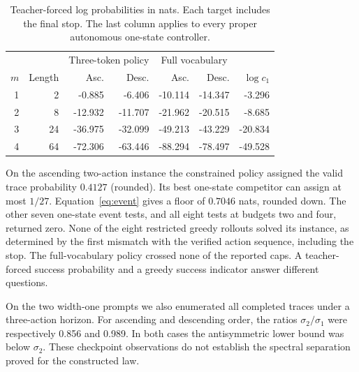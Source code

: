 \begin{table}[ht]
\centering\small
\caption{Teacher-forced log probabilities in nats. Each target includes the final stop. The last column applies to every proper autonomous one-state controller.}\label{tab:qwen}
\begin{tabular}{rr rr rr r}\toprule
&& \multicolumn{2}{c}{Three-token policy}&\multicolumn{2}{c}{Full vocabulary}&\\
$m$ & Length & Asc. & Desc. & Asc. & Desc. & $\log c_1$\\\midrule
1 & 2 & -0.885 & -6.406 & -10.114 & -14.347 & -3.296 \\
2 & 8 & -12.932 & -11.707 & -21.962 & -20.515 & -8.685 \\
3 & 24 & -36.975 & -32.099 & -49.213 & -43.229 & -20.834 \\
4 & 64 & -72.306 & -63.446 & -88.294 & -78.497 & -49.528 \\
\bottomrule\end{tabular}
\end{table}
On the ascending two-action instance the constrained policy assigned the valid trace probability $0.4127$ (rounded). Its best one-state competitor can assign at most $1/27$. Equation~\eqref{eq:event} gives a floor of $0.7046$ nats, rounded down. The other seven one-state event tests, and all eight tests at budgets two and four, returned zero. None of the eight restricted greedy rollouts solved its instance, as determined by the first mismatch with the verified action sequence, including the stop. The full-vocabulary policy crossed none of the reported caps. A teacher-forced success probability and a greedy success indicator answer different questions.

On the two width-one prompts we also enumerated all completed traces under a three-action horizon. For ascending and descending order, the ratios $\sigma_2/\sigma_1$ were respectively 0.856 and 0.989. In both cases the antisymmetric lower bound was below $\sigma_2$. These checkpoint observations do not establish the spectral separation proved for the constructed law.

